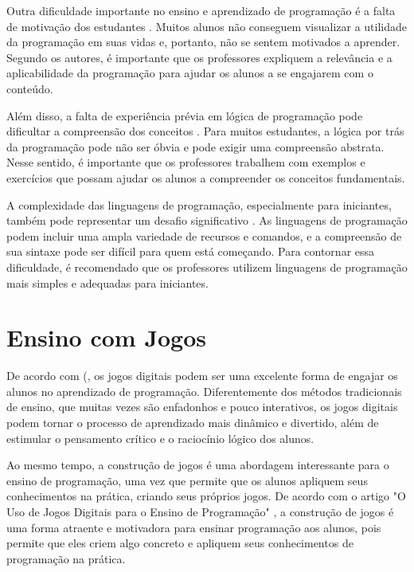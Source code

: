Outra dificuldade importante no ensino e aprendizado de programação é a falta de motivação dos estudantes \cite{Silva2014}. Muitos alunos não conseguem visualizar a utilidade da programação em suas vidas e, portanto, não se sentem motivados a aprender. Segundo os autores, é importante que os professores expliquem a relevância e a aplicabilidade da programação para ajudar os alunos a se engajarem com o conteúdo.

Além disso, a falta de experiência prévia em lógica de programação pode dificultar a compreensão dos conceitos \cite{Silva2014}. Para muitos estudantes, a lógica por trás da programação pode não ser óbvia e pode exigir uma compreensão abstrata. Nesse sentido, é importante que os professores trabalhem com exemplos e exercícios que possam ajudar os alunos a compreender os conceitos fundamentais.

A complexidade das linguagens de programação, especialmente para iniciantes, também pode representar um desafio significativo \cite{Silva2014}. As linguagens de programação podem incluir uma ampla variedade de recursos e comandos, e a compreensão de sua sintaxe pode ser difícil para quem está começando. Para contornar essa dificuldade, é recomendado que os professores utilizem linguagens de programação mais simples e adequadas para iniciantes.

\section{Ensino com Jogos}

De acordo com \citeauthor{Moreira2018} (\citeyear{Moreira2018}, os jogos digitais podem ser uma excelente forma de engajar os alunos no aprendizado de programação. Diferentemente dos métodos tradicionais de ensino, que muitas vezes são enfadonhos e pouco interativos, os jogos digitais podem tornar o processo de aprendizado mais dinâmico e divertido, além de estimular o pensamento crítico e o raciocínio lógico dos alunos.

Ao mesmo tempo, a construção de jogos é uma abordagem interessante para o ensino de programação, uma vez que permite que os alunos apliquem seus conhecimentos na prática, criando seus próprios jogos. De acordo com o artigo "O Uso de Jogos Digitais para o Ensino de Programação" \cite{Moreira2018}, a construção de jogos é uma forma atraente e motivadora para ensinar programação aos alunos, pois permite que eles criem algo concreto e apliquem seus conhecimentos de programação na prática.

